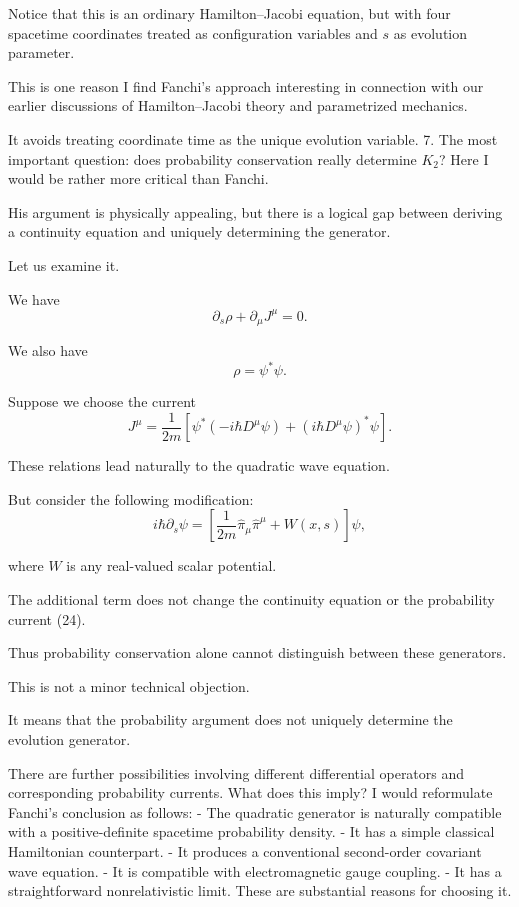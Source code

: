 Notice that this is an ordinary Hamilton–Jacobi equation, but with four spacetime coordinates treated as configuration variables and \(s\) as evolution parameter.

This is one reason I find Fanchi's approach interesting in connection with our earlier discussions of Hamilton–Jacobi theory and parametrized mechanics.

It avoids treating coordinate time as the unique evolution variable.
7. The most important question: does probability conservation really determine \(K_2\)?
Here I would be rather more critical than Fanchi.

His argument is physically appealing, but there is a logical gap between deriving a continuity equation and uniquely determining the generator.

Let us examine it.

We have
\[
\partial_s\rho+\partial_\mu J^\mu=0.
\tag{23}
\]

We also have
\[
\rho=\psi^*\psi.
\]

Suppose we choose the current
\[
J^\mu=
\frac{1}{2m}
\left[
\psi^*(-i\hbar D^\mu\psi)
+
(i\hbar D^\mu\psi)^*\psi
\right].
\tag{24}
\]

These relations lead naturally to the quadratic wave equation.

But consider the following modification:
\[
i\hbar\partial_s\psi
=
\left[
\frac{1}{2m}\hat\pi_\mu\hat\pi^\mu
+W(x,s)
\right]\psi,
\tag{25}
\]

where \(W\) is any real-valued scalar potential.

The additional term does not change the continuity equation or the probability current (24).

Thus probability conservation alone cannot distinguish between these generators.

This is not a minor technical objection.

It means that the probability argument does not uniquely determine the evolution generator.

There are further possibilities involving different differential operators and corresponding probability currents.
What does this imply?
I would reformulate Fanchi's conclusion as follows:
- The quadratic generator is naturally compatible with a positive-definite spacetime probability density.
- It has a simple classical Hamiltonian counterpart.
- It produces a conventional second-order covariant wave equation.
- It is compatible with electromagnetic gauge coupling.
- It has a straightforward nonrelativistic limit.
These are substantial reasons for choosing it.


